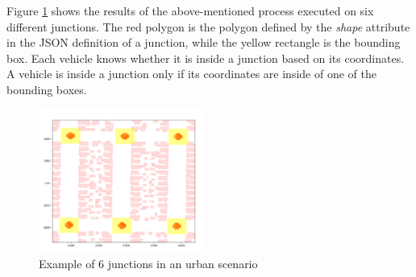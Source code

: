		Figure \ref{fig:junction-example} shows the results of the above-mentioned process executed on six different junctions. The red polygon is the polygon defined by the \textit{shape} attribute in the JSON definition of a junction, while the yellow rectangle is the bounding box. Each vehicle knows whether it is inside a junction based on its coordinates. A vehicle is inside a junction only if its coordinates are inside of one of the bounding boxes.
	
		\begin{figure}[H]
			\centering
			\includegraphics[width=0.48\textwidth]{immagini/junction-example}
			\caption{Example of 6 junctions in an urban scenario}
			\label{fig:junction-example}
		\end{figure}
		